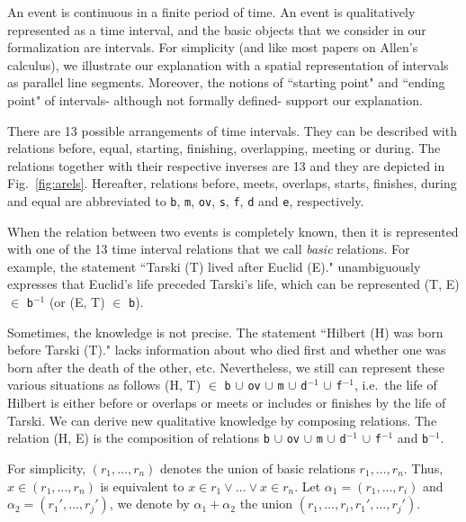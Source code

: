 \documentclass{llncs}
\begin{document}
An event is continuous in a finite period of time. An event is qualitatively represented as a time interval, and  the basic objects that we consider in our formalization are  intervals. %
For simplicity (and like most papers on Allen's calculus), we illustrate our explanation with a spatial representation of intervals as parallel line segments. Moreover,  the notions of ``starting point" and ``ending point" of intervals- although not formally defined- support our explanation. %

There are  13 possible arrangements of time intervals. They can be described with relations {before}, {equal}, {starting}, {finishing}, {overlapping}, {meeting} or {during}. %
The relations together with their respective inverses are 13 and they are depicted in Fig.~\ref{fig:arels}. Hereafter, relations before, meets, overlaps, starts, finishes, during and equal are abbreviated to \texttt{b}, \texttt{m}, \texttt{ov}, \texttt{s}, \texttt{f}, \texttt{d} and \texttt{e}, respectively. 

When the relation between two events is completely known, then it is represented with one of the 13 time interval relations that we call \textit{basic} relations. For example, the statement  ``Tarski (T) lived after Euclid (E)."  unambiguously expresses that Euclid's life preceded Tarski's life, which can be represented (T, E) $\in$ \texttt{b}$^{-1}$ (or (E, T) $\in$ \texttt{b}). 

Sometimes, the knowledge is not precise. The statement ``Hilbert (H) was born before Tarski (T)." lacks information about who died first and whether one was born after the death of the other, etc.  Nevertheless, we still can  represent these various situations as follows (H, T) $\in$ \texttt{b} $\cup$ \texttt{ov} $\cup$ \texttt{m} $\cup$ \texttt{d}$^{-1}$ $\cup$ \texttt{f}$^{-1}$, i.e.~the life of Hilbert is either before or overlaps or meets or includes or finishes by the life of Tarski. We can derive new qualitative knowledge by composing relations. The relation (H, E) is the composition of relations  \texttt{b} $\cup$ \texttt{ov} $\cup$ \texttt{m} $\cup$ \texttt{d}$^{-1}$ $\cup$ \texttt{f}$^{-1}$ and \texttt{b}$^{-1}$.

For simplicity, $(r_1, \ldots, r_n)$ denotes the union of basic relations $r_1, \ldots, r_n$. Thus, $x \in (r_1, \ldots, r_n)$ is equivalent to $x \in r_1 \lor \ldots \lor  x \in r_n$. Let $\alpha_1 = (r_1, \ldots, r_i)$ and $\alpha_2 = (r_1', \ldots, r_j')$, we denote by $\alpha_1 + \alpha_2$ the union $(r_1, \ldots, r_i, r_1', \ldots, r_j')$. %
\end{document}
